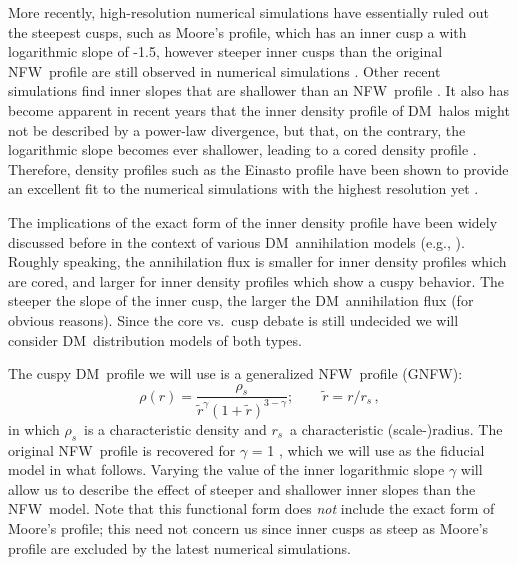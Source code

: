\documentclass[aps,prd,twocolumn,amsmath,amssymb,floatfix,nofootinbib,10pt]{revtex4}
\newcommand{\eg}{e.g.}
\newcommand{\NFW}{NFW}
\newcommand{\GNFW}{G\NFW}
\newcommand{\DM}{DM}
\newcommand{\redr}{\ensuremath{\tilde{r}}}
\newcommand{\rhos}{\ensuremath{\rho_s}}
\newcommand{\rs}{\ensuremath{r_s}}
\begin{document}
More recently, high-resolution numerical simulations have essentially
ruled out the steepest cusps, such as Moore's profile, which has an
inner cusp a with logarithmic slope of -1.5, however steeper inner
cusps than the original \NFW\ profile are still observed in numerical
simulations \cite{2005MNRAS.364..665D}. Other recent simulations find
inner slopes that are shallower than an \NFW\ profile
\cite{2008MNRAS.385..545K,2008arXiv0808.2981S,2008arXiv0810.1522N}. It
also has become apparent in recent years that the inner density
profile of \DM\ halos might not be described by a power-law
divergence, but that, on the contrary, the logarithmic slope becomes
ever shallower, leading to a cored density profile
\cite{2004MNRAS.349.1039N,2005ApJ...624L..85M,2006AJ....132.2685M,2006AJ....132.2701G,2006MNRAS.365..147S,2008arXiv0808.2981S,2008MNRAS.391.1685S,2008arXiv0810.1522N}. Therefore,
density profiles such as the Einasto profile
\cite{einasto65a,1989A&A...223...89E} have been shown to provide an
excellent fit to the numerical simulations with the highest resolution
yet \cite{2008MNRAS.391.1685S,2008arXiv0808.2981S}.

The implications of the exact form of the inner density profile have
been widely discussed before in the context of various \DM\
annihilation models (\eg,
\cite{1998APh.....9..137B,1999PhRvL..83.1719G,2000PhRvD..62l3005C,2000PhLB..494..181G,2002PhRvD..66b3509T,2002PhRvD..66l3502U,2003MNRAS.339..505T,2004ApJ...601...47A,2008JCAP...07..013B,2008arXiv0811.3744B,2008arXiv0812.3895B}). Roughly
speaking, the annihilation flux is smaller for inner density profiles
which are cored, and larger for inner density profiles which show a
cuspy behavior. The steeper the slope of the inner cusp, the larger
the \DM\ annihilation flux (for obvious reasons). Since the core
vs.~cusp debate is still undecided we will consider \DM\ distribution
models of both types.

The cuspy \DM\ profile we will use is a generalized \NFW\ profile (\GNFW):
\begin{equation}\label{eq:NFW}
\rho(r) = \frac{\rhos}{\redr^\gamma\left(1+\redr\right)^{3-\gamma}};\qquad \redr = r/\rs\, ,
\end{equation}
in which \rhos\ is a characteristic density and \rs\ a characteristic
(scale-)radius.  The original \NFW\ profile is recovered for $\gamma$
= 1 \cite{1997ApJ...490..493N}, which we will use as the fiducial
model in what follows. Varying the value of the inner logarithmic
slope $\gamma$ will allow us to describe the effect of steeper and
shallower inner slopes than the \NFW\ model. Note that this functional
form does \emph{not} include the exact form of Moore's profile; this
need not concern us since inner cusps as steep as Moore's profile are
excluded by the latest numerical simulations.
\end{document}
